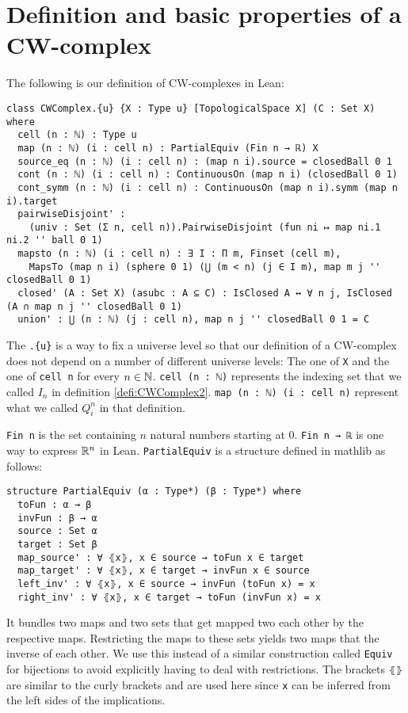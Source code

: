\section{Definition and basic properties of a CW-complex}

The following is our definition of CW-complexes in Lean:

\begin{lstlisting}
class CWComplex.{u} {X : Type u} [TopologicalSpace X] (C : Set X) where
  cell (n : ℕ) : Type u
  map (n : ℕ) (i : cell n) : PartialEquiv (Fin n → ℝ) X
  source_eq (n : ℕ) (i : cell n) : (map n i).source = closedBall 0 1
  cont (n : ℕ) (i : cell n) : ContinuousOn (map n i) (closedBall 0 1)
  cont_symm (n : ℕ) (i : cell n) : ContinuousOn (map n i).symm (map n i).target
  pairwiseDisjoint' :
    (univ : Set (Σ n, cell n)).PairwiseDisjoint (fun ni ↦ map ni.1 ni.2 '' ball 0 1)
  mapsto (n : ℕ) (i : cell n) : ∃ I : Π m, Finset (cell m),
    MapsTo (map n i) (sphere 0 1) (⋃ (m < n) (j ∈ I m), map m j '' closedBall 0 1)
  closed' (A : Set X) (asubc : A ⊆ C) : IsClosed A ↔ ∀ n j, IsClosed (A ∩ map n j '' closedBall 0 1)
  union' : ⋃ (n : ℕ) (j : cell n), map n j '' closedBall 0 1 = C
\end{lstlisting}

The \lstinline|.{u}| is a way to fix a universe level so that our definition of a CW-complex does not depend on a number of different universe levels: The one of \lstinline{X} and the one of \lstinline{cell n} for every $n \in \mathbb{N}$.
\lstinline{cell (n : ℕ)} represents the indexing set that we called $I_n$ in definition \ref{defi:CWComplex2}. \lstinline{map (n : ℕ) (i : cell n)} represent what we called $Q_i^n$ in that definition. 

\lstinline{Fin n} is the set containing $n$ natural numbers starting at 0. 
\lstinline{Fin n → ℝ} is one way to express $\mathbb{R}^n$ in Lean. 
\lstinline{PartialEquiv} is a structure defined in mathlib as follows: 

\begin{lstlisting}
structure PartialEquiv (α : Type*) (β : Type*) where
  toFun : α → β
  invFun : β → α
  source : Set α
  target : Set β
  map_source' : ∀ ⦃x⦄, x ∈ source → toFun x ∈ target
  map_target' : ∀ ⦃x⦄, x ∈ target → invFun x ∈ source
  left_inv' : ∀ ⦃x⦄, x ∈ source → invFun (toFun x) = x
  right_inv' : ∀ ⦃x⦄, x ∈ target → toFun (invFun x) = x
\end{lstlisting}

It bundles two maps and two sets that get mapped two each other by the respective maps. 
Restricting the maps to these sets yields two maps that the inverse of each other. 
We use this instead of a similar construction called \lstinline{Equiv} for bijections to avoid explicitly having to deal with restrictions. 
The brackets \lstinline{⦃⦄} are similar to the curly brackets and are used here since \lstinline{x} can be inferred from the left sides of the implications.

